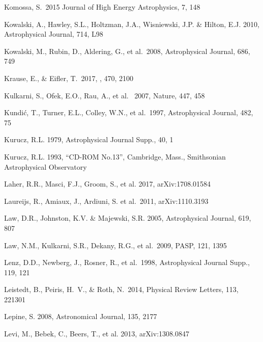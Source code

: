 \documentclass[twocolumn]{aastex61}
\begin{document}
\begin{thebibliography}{}
 Komossa, S.~2015 Journal of High Energy Astrophysics, 7, 148


 Kowalski, A., Hawley, S.L., Holtzman, J.A., Wisniewski, J.P. \& Hilton, E.J. 2010, Astrophysical Journal, 714, L98

 Kowalski, M., Rubin, D., Aldering, G., et al.~2008,  Astrophysical Journal, 686, 749

 Krause, E., \& Eifler, T.\ 2017, \mnras, 470, 2100

 Kulkarni, S., Ofek, E.O., Rau, A., et al.~ 2007, Nature, 447, 458

 Kundi\'{c}, T., Turner, E.L., Colley, W.N., et al.~1997, Astrophysical Journal, 482, 75

 Kurucz, R.L. 1979, Astrophysical Journal Supp., 40, 1

 Kurucz, R.L. 1993, ``CD-ROM No.13'', Cambridge, Mass., Smithsonian Astrophysical Observatory

 Laher, R.R., Masci, F.J., Groom, S., et al. 2017, arXiv:1708.01584

 Laureijs, R., Amiaux, J., Ardiuni, S. et al.~2011, arXiv:1110.3193

 Law, D.R., Johnston, K.V. \& Majewski, S.R. 2005,  Astrophysical Journal, 619, 807

 Law, N.M., Kulkarni, S.R., Dekany, R.G., et al.~2009, PASP, 121, 1395

 Lenz, D.D., Newberg, J., Rosner, R., et al.~1998, Astrophysical Journal Supp., 119, 121

 Leistedt, B., Peiris, H.~V., \& Roth, N.\ 2014, Physical Review Letters, 113, 221301

 Lepine, S. 2008, Astronomical Journal, 135, 2177

 Levi, M., Bebek, C., Beers, T., et al. 2013, arXiv:1308.0847


\end{thebibliography}
\end{document}
